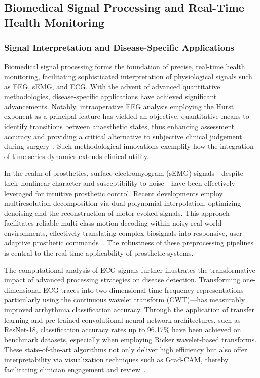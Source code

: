 \documentclass[sigconf]{acmart}
\begin{document}
\subsection{Biomedical Signal Processing and Real-Time Health Monitoring}

\subsubsection{Signal Interpretation and Disease-Specific Applications}

Biomedical signal processing forms the foundation of precise, real-time health monitoring, facilitating sophisticated interpretation of physiological signals such as EEG, sEMG, and ECG. With the advent of advanced quantitative methodologies, disease-specific applications have achieved significant advancements. Notably, intraoperative EEG analysis employing the Hurst exponent as a principal feature has yielded an objective, quantitative means to identify transitions between anaesthetic states, thus enhancing assessment accuracy and providing a critical alternative to subjective clinical judgement during surgery~\cite{ref96}. Such methodological innovations exemplify how the integration of time-series dynamics extends clinical utility.

In the realm of prosthetics, surface electromyogram (sEMG) signals—despite their nonlinear character and susceptibility to noise—have been effectively leveraged for intuitive prosthetic control. Recent developments employ multiresolution decomposition via dual-polynomial interpolation, optimizing denoising and the reconstruction of motor-evoked signals. This approach facilitates reliable multi-class motion decoding within noisy real-world environments, effectively translating complex biosignals into responsive, user-adaptive prosthetic commands~\cite{ref97}. The robustness of these preprocessing pipelines is central to the real-time applicability of prosthetic systems.

The computational analysis of ECG signals further illustrates the transformative impact of advanced processing strategies on disease detection. Transforming one-dimensional ECG traces into two-dimensional time-frequency representations—particularly using the continuous wavelet transform (CWT)—has measurably improved arrhythmia classification accuracy. Through the application of transfer learning and pre-trained convolutional neural network architectures, such as ResNet-18, classification accuracy rates up to 96.17\% have been achieved on benchmark datasets, especially when employing Ricker wavelet-based transforms. These state-of-the-art algorithms not only deliver high efficiency but also offer interpretability via visualization techniques such as Grad-CAM, thereby facilitating clinician engagement and review~\cite{ref101}.
\end{document}
